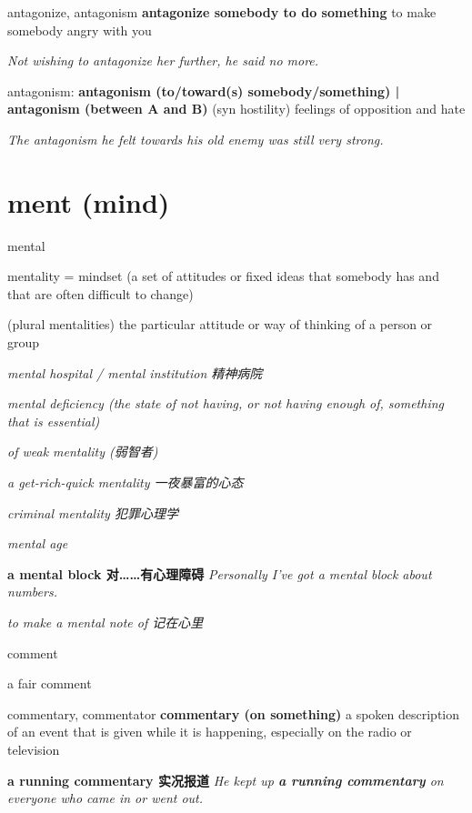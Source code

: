 \begin{DefWord}{antagonize, antagonism}
    \textbf{antagonize somebody to do something} to make somebody angry with you

    \textit{Not wishing to antagonize her further, he said no more.}

    antagonism:
   \textbf{ antagonism (to/toward(s) somebody/something) | antagonism (between A and B)} (syn hostility) feelings of opposition and hate
   
   \textit{The antagonism he felt towards his old enemy was still very strong.}
\end{DefWord}


\section{ment (mind)}

\begin{DefWord}{mental}
\end{DefWord}

\begin{DefWord}{mentality}
    = mindset (a set of attitudes or fixed ideas that somebody has and that are often difficult to change)

    (plural mentalities)
    the particular attitude or way of thinking of a person or group

    \textit{mental hospital / mental institution 精神病院}

    \textit{mental deficiency (the state of not having, or not having enough of, something that is essential)}

    \textit{of weak mentality (弱智者)}

    \textit{a get-rich-quick mentality 一夜暴富的心态}

    \textit{criminal mentality 犯罪心理学}

    \textit{mental age}

    \textbf{a mental block 对……有心理障碍}
    \textit{Personally I've got a mental block about numbers.}

    \textit{to make a mental note of 记在心里}


\end{DefWord}

\begin{DefWord}{comment}

    a fair comment
\end{DefWord}



\begin{RefWord}{commentary, commentator}
    \textbf{commentary (on something)} a spoken description of an event that is given while it is happening, especially on the radio or television

    \textbf{a running commentary 实况报道}
    \textit{He kept up \textbf{a running commentary} on everyone who came in or went out.}
\end{RefWord}





